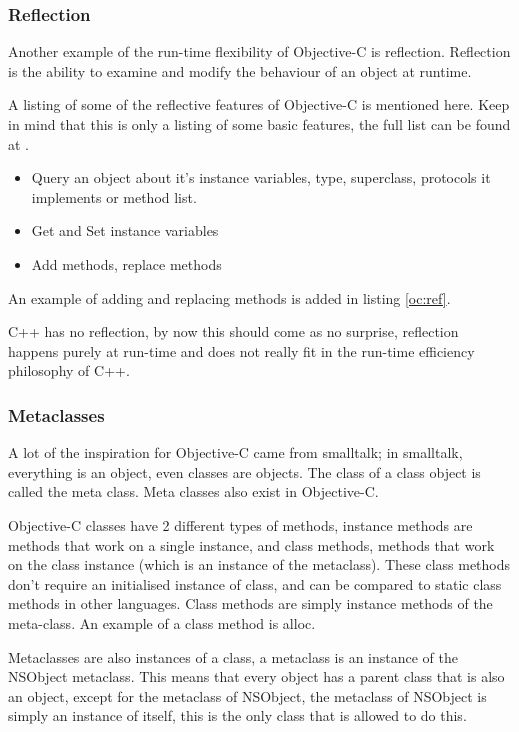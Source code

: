 \documentclass[12pt, a4paper, twocolumn]{article}
\begin{document}
\subsubsection{Reflection}
\label{sec:reflection}
Another example of the run-time flexibility of Objective-C is reflection. Reflection is the ability to examine and modify the behaviour of an object at runtime.

A listing of some of the reflective features of Objective-C is mentioned here. Keep in mind that this is only a listing of some basic features, the full list can be found at \cite{OCrefl}.
\begin{itemize}
\item Query an object about it's instance variables, type, superclass, protocols it implements or method list.
\item Get and Set instance variables
\item Add methods, replace methods
\end{itemize}

An example of adding and replacing methods is added in listing \ref{oc:ref}.

C++ has no reflection, by now this should come as no surprise, reflection happens purely at run-time and does not really fit in the run-time efficiency philosophy of C++.

\subsubsection{Metaclasses}
\label{sec:meta}
A lot of the inspiration for Objective-C came from smalltalk; in smalltalk, everything is an object, even classes are objects. The class of a class object is called the meta class. Meta classes also exist in Objective-C.

Objective-C classes have 2 different types of methods, instance methods are methods that work on a single instance, and class methods, methods that work on the class instance (which is an instance of the metaclass). These class methods don't require an initialised instance of class, and can be compared to static class methods in other languages. Class methods are simply instance methods of the meta-class. An example of a class method is alloc.

Metaclasses are also instances of a class, a metaclass is an instance of the NSObject metaclass. This means that every object has a parent class that is also an object, except for the metaclass of NSObject, the metaclass of NSObject is simply an instance of itself, this is the only class that is allowed to do this.
\end{document}
